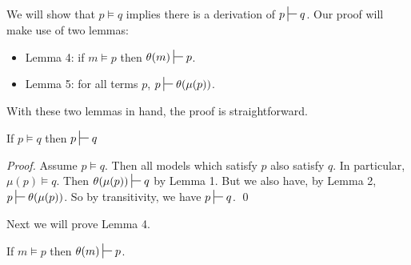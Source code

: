 We will show that $p \models q$ implies there is a derivation of $p \judge q$.
Our proof will make use of two lemmas:
\begin{itemize}
\item
Lemma 4: if $m \models p$ then $\theta(m) \judge p$.
\item
Lemma 5: for all terms $p$, $p \judge \theta(\mu(p))$.
\end{itemize}
With these two lemmas in hand, the proof is straightforward.
\begin{theorem}
If $p \models q$ then $p \judge q$
\end{theorem}
\begin{proof}
Assume $p \models q$. 
Then all models which satisfy $p$ also satisfy $q$.
In particular, $\mu(p) \models q$.
Then $\theta(\mu(p)) \judge q$ by Lemma 1.
But we also have, by Lemma 2, $p \judge \theta(\mu(p)) $.
So by transitivity, we have $p \judge q$.
\qed
\end{proof}
Next we will prove Lemma 4.
\begin{lemma}
If $m \models p$ then $\theta(m) \judge p$.
\end{lemma}
